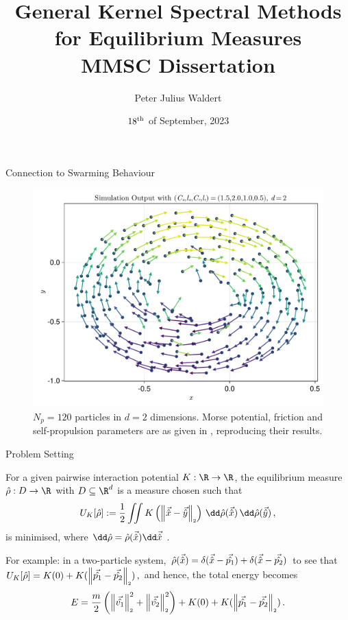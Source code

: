 \documentclass[aspectratio=169, hyperref={colorlinks=true}]{beamer}
\title{General Kernel Spectral Methods for Equilibrium Measures \\ \normalsize MMSC Dissertation}
\author{Peter Julius Waldert}
\institute{Mathematical Institute \\ University of Oxford}
\date{$18^{\rm th}$ of September, 2023}
\begin{document}
  {\frame{\titlepage}}

  \begin{frame}{Connection to Swarming Behaviour}
    \begin{figure}[H]
      \centering
      \includegraphics[width=0.56\linewidth]{results/morse-2d/simulation-quiver.pdf}
      \caption[Quiver plot of 120 particles in 2D interacting through the Morse potential]{$N_p = 120$ particles in $d = 2$ dimensions. Morse potential, friction and self-propulsion parameters are as given in \cite{2006-self-propelled}, reproducing their results.}
      \label{fig:simulation-quiver-illustration}
    \end{figure}
  \end{frame}

  \begin{frame}{Problem Setting}
    \begin{definition}
      For a given pairwise interaction potential $K: \R \to \R$, the equilibrium measure $\hat{\rho}: D \to \R$ with $D \subseteq \R^d$ is a measure chosen such that
      $$U_K[\hat{\rho}] := \frac{1}{2} \iint K\left(\norm{\hatvec{x} - \hatvec{y}}\right) \,\dd\hat{\rho}(\hatvec{x})\,\dd\hat{\rho}(\hatvec{y})\,,$$
      is minimised, where $\dd\hat{\rho} = \hat{\rho}(\hatvec{x})\dd\hatvec{x}$ \parencite{2021-arbitrary-dimensions}.
    \end{definition}
    \pause

    For example: in a two-particle system, $\hat{\rho}(\vec{\hat{x}}) = \delta(\vec{\hat{x}}-\vec{\hat{p_1}}) + \delta(\vec{\hat{x}}-\vec{\hat{p_2}})$ to see that
    $U_K[\hat{\rho}] = K(0) + K(\left\lVert\vec{\hat{p_1}} - \vec{\hat{p_2}}\right\rVert_{\scriptscriptstyle 2})\,,$
    and hence, the total energy becomes
    $$E = \frac{m}{2} \left(\left\lVert\vec{\hat{v_1}}\right\rVert_{\scriptscriptstyle 2}^2 + \left\lVert\vec{\hat{v_2}}\right\rVert_{\scriptscriptstyle 2}^2\right) + K(0) + K(\left\lVert\vec{\hat{p_1}} - \vec{\hat{p_2}}\right\rVert_{\scriptscriptstyle 2})\,.$$
  \end{frame}
\end{document}
